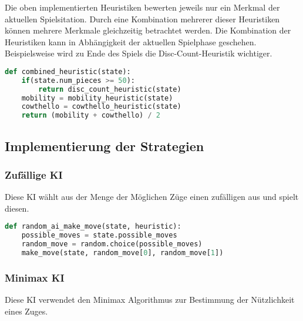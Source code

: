 Die oben implementierten Heuristiken bewerten jeweils nur ein Merkmal
der aktuellen Spielsitation. Durch eine Kombination mehrerer dieser
Heuristiken können mehrere Merkmale gleichzeitig betrachtet werden. Die
Kombination der Heuristiken kann in Abhängigkeit der aktuellen
Spielphase geschehen. Beispielsweise wird zu Ende des Spiels die
Disc-Count-Heuristik wichtiger.

\begin{lstlisting}[language=Python]
def combined_heuristic(state):
    if(state.num_pieces >= 50):
        return disc_count_heuristic(state)
    mobility = mobility_heuristic(state)
    cowthello = cowthello_heuristic(state)
    return (mobility + cowthello) / 2
\end{lstlisting}

\hypertarget{implementierung-der-strategien}{%
\subsection{Implementierung der
Strategien}\label{implementierung-der-strategien}}

\hypertarget{zufuxe4llige-ki}{%
\subsubsection{Zufällige KI}\label{zufuxe4llige-ki}}

Diese KI wählt aus der Menge der Möglichen Züge einen zufälligen aus und
spielt diesen.

\begin{lstlisting}[language=Python]
def random_ai_make_move(state, heuristic):
    possible_moves = state.possible_moves
    random_move = random.choice(possible_moves)
    make_move(state, random_move[0], random_move[1])
\end{lstlisting}

\hypertarget{minimax-ki}{%
\subsubsection{Minimax KI}\label{minimax-ki}}

Diese KI verwendet den Minimax Algorithmus zur Bestimmung der
Nützlichkeit eines Zuges.

